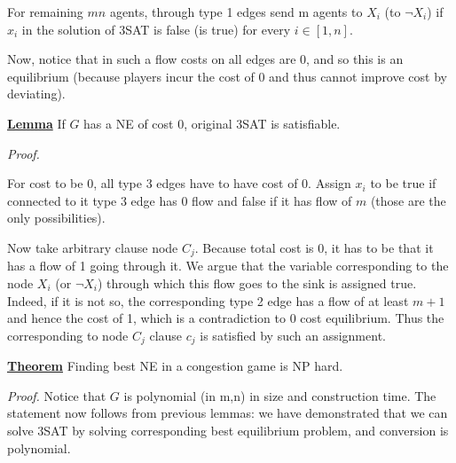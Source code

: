 For remaining $mn$ agents, through type 1 edges send m agents to $X_i$ (to $\neg X_i$) if $x_i$ in the solution of 3SAT is false (is true) for every $i\in[1,n]$.

Now, notice that in such a flow costs on all edges are 0, and so this is an equilibrium (because players incur the cost of 0 and thus cannot improve cost by deviating).

\uline{\textbf{Lemma}} If  $G$ has a NE of cost 0, original 3SAT is satisfiable.

\textit{Proof.}

For cost to be 0, all type 3 edges have to have cost of 0. Assign $x_i$ to be true if connected to it type 3 edge has 0 flow and false if it has flow of $m$ (those are the only possibilities). 

Now take arbitrary clause node $C_j$. Because total cost is 0, it has to be that it has a flow of 1 going through it. We argue that the variable corresponding to the node $X_i$ (or $\neg X_i$) through which this flow goes to the sink is assigned true. Indeed, if it is not so, the corresponding type 2 edge has a flow of at least $m+1$ and hence the cost of 1, which is a contradiction to 0 cost equilibrium. Thus the corresponding to node $C_j$ clause $c_j$ is satisfied by such an assignment.

\uline{\textbf{Theorem}} Finding best NE in a congestion game is NP hard.

\textit{Proof.} Notice that $G$ is polynomial (in m,n) in size and construction time. The statement now follows from previous lemmas: we have demonstrated that we can solve 3SAT by solving corresponding best equilibrium problem, and conversion is polynomial.

